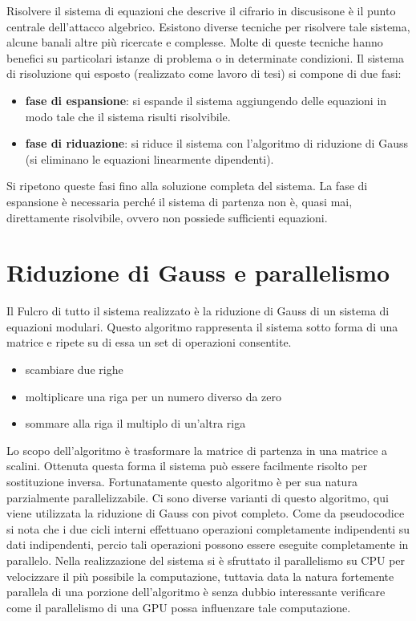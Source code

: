 \documentclass{article}
\begin{document}
Risolvere il sistema di equazioni che descrive il cifrario in discusisone è il punto centrale dell'attacco algebrico. Esistono diverse tecniche per risolvere tale sistema, alcune banali altre più ricercate e complesse. Molte di queste tecniche hanno benefici su particolari istanze di problema o in determinate condizioni. Il sistema di risoluzione qui esposto (realizzato come lavoro di tesi) si compone di due fasi: 

\begin{itemize}
\item \textbf{fase di espansione}: si espande il sistema aggiungendo delle equazioni in modo tale che il sistema risulti risolvibile.
\item \textbf{fase di riduazione}: si riduce il sistema con l'algoritmo di riduzione di Gauss (si eliminano le equazioni linearmente dipendenti).

\end{itemize}

Si ripetono queste fasi fino alla soluzione completa del sistema. La fase di espansione è necessaria perché il sistema di partenza non è, quasi mai, direttamente risolvibile, ovvero non possiede sufficienti equazioni.

\section{Riduzione di Gauss e parallelismo}

Il Fulcro di tutto il sistema realizzato è la riduzione di Gauss di un sistema di equazioni modulari. Questo algoritmo rappresenta il sistema sotto forma di una matrice e ripete su di essa un set di operazioni consentite.
\begin{itemize}
\item scambiare due righe
\item moltiplicare una riga per un numero diverso da zero
\item sommare alla riga il multiplo di un'altra riga
\end{itemize}

Lo scopo dell'algoritmo è trasformare la matrice di partenza in una matrice a scalini. Ottenuta questa forma il sistema può essere facilmente risolto per sostituzione inversa. Fortunatamente questo algoritmo è per sua natura parzialmente parallelizzabile. Ci sono diverse varianti di questo algoritmo, qui viene utilizzata la riduzione di Gauss con pivot completo. Come da pseudocodice si nota che i due cicli interni effettuano operazioni completamente indipendenti su dati indipendenti, percio tali operazioni possono essere eseguite completamente in parallelo. Nella realizzazione del sistema si è sfruttato il parallelismo su CPU per velocizzare il più possibile la computazione, tuttavia data la natura fortemente parallela di una porzione dell'algoritmo è senza dubbio interessante verificare come il parallelismo di una GPU possa influenzare tale computazione.
\end{document}
